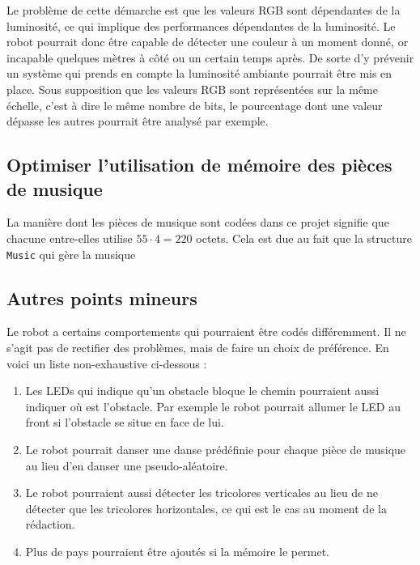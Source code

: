 \documentclass{article}
\begin{document}
    Le problème de cette démarche est que les valeurs RGB sont dépendantes de la luminosité, ce qui implique des performances dépendantes de la luminosité.
    Le robot pourrait donc être capable de détecter une couleur à un moment donné, or incapable quelques mètres à côté ou un certain temps après.
    De sorte d'y prévenir un système qui prends en compte la luminosité ambiante pourrait être mis en place.
    Sous supposition que les valeurs RGB sont représentées sur la même échelle, c'est à dire le même nombre de bits, le pourcentage dont une valeur dépasse les autres pourrait être analysé par exemple. 
    
    \subsection{Optimiser l'utilisation de mémoire des pièces de musique}
    La manière dont les pièces de musique sont codées dans ce projet signifie que chacune entre-elles utilise $55 \cdot 4 = 220$ octets.
    Cela est due au fait que la structure \texttt{Music} qui gère la musique 
    
    \subsection{Autres points mineurs}
    Le robot a certains comportements qui pourraient être codés différemment.
    Il ne s'agit pas de rectifier des problèmes, mais de faire un choix de préférence.
    En voici un liste non-exhaustive ci-dessous : 
    \begin{enumerate}
        \item Les LEDs qui indique qu'un obstacle bloque le chemin pourraient aussi indiquer où est l'obstacle.
        Par exemple le robot pourrait allumer le LED au front si l'obstacle se situe en face de lui.
        \item Le robot pourrait danser une danse prédéfinie pour chaque pièce de musique au lieu d'en danser une pseudo-aléatoire.
        \item Le robot pourraient aussi détecter les tricolores verticales au lieu de ne détecter que les tricolores horizontales, ce qui est le cas au moment de la rédaction.
        \item Plus de pays pourraient être ajoutés si la mémoire le permet.
    \end{enumerate}
    
    
\end{document}

